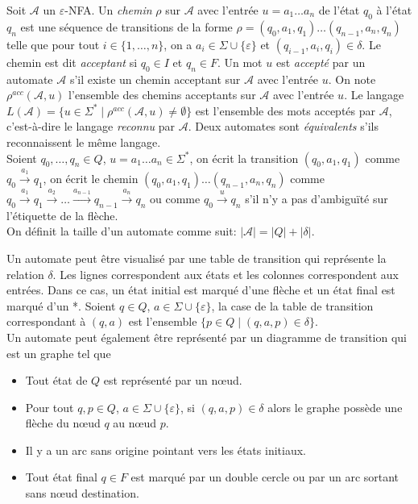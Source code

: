 	Soit $\mathscr{A}$ un $\varepsilon$-NFA. Un \emph{chemin} $\rho$ sur $\mathscr{A}$ avec l'entrée $u=a_1\ldots a_n$ de l'état $q_0$ à l'état $q_n$ est une séquence de transitions de la forme $\rho = (q_0,a_1, q_1)\ldots(q_{n-1},a_n,q_n)$ telle que pour tout $i \in \{1,\ldots ,n\}$, on a $a_i \in \Sigma \cup \{\varepsilon\}$ et $(q_{i-1},a_i,q_i) \in \delta$. Le chemin est dit \emph{acceptant} si $q_0 \in I$ et $q_n \in F$. Un mot $u$ est \emph{accepté} par un automate $\mathscr{A}$ s'il existe un chemin acceptant sur $\mathscr{A}$ avec l'entrée $u$. On note $\rho^{acc}(\mathscr{A},u)$ l'ensemble des chemins acceptants sur $\mathscr{A}$ avec l'entrée $u$. Le langage $L(\mathscr{A}) = \{u \in \Sigma^* \mid \rho^{acc}(\mathscr{A},u) \neq \emptyset\}$ est l'ensemble des mots acceptés par $\mathscr{A}$, c'est-à-dire le langage \emph{reconnu} par $\mathscr{A}$. Deux automates sont \emph{équivalents} s'ils reconnaissent le même langage. \\
	Soient $q_0,\ldots, q_n \in Q$, $u = a_1\ldots a_n \in \Sigma^*$, on écrit la transition $(q_0, a_1, q_1)$ comme $q_0 \xrightarrow{a_1} q_1$, on écrit le chemin $(q_0, a_1, q_1)\ldots(q_{n-1}, a_n, q_n)$ comme $q_0 \xrightarrow{a_1} q_1\xrightarrow{a_2}\ldots \xrightarrow{a_{n-1}}q_{n-1} \xrightarrow{a_n} q_n$ ou comme $q_0 \xrightarrow{u} q_n$ s'il n'y a pas d'ambiguïté sur l'étiquette de la flèche. \\
	On définit la taille d'un automate comme suit: $|\mathscr{A}| = |Q|+|\delta|$.
	
	Un automate peut être visualisé par une table de transition qui représente la relation $\delta$. Les lignes correspondent aux états et les colonnes correspondent aux entrées. Dans ce cas, un état initial est marqué d'une flèche et un état final est marqué d'un *. Soient $q \in Q$, $a \in \Sigma \cup \{\varepsilon\}$, la case de la table de transition correspondant à $(q,a)$ est l'ensemble $\{p \in Q \mid (q,a,p) \in \delta\}$.\\
	Un automate peut également être représenté par un diagramme de transition qui est un graphe tel que

	\begin{itemize}
		\item Tout état de $Q$ est représenté par un n\oe{}ud.
		\item Pour tout $q,p \in Q$, $a \in \Sigma \cup \{\varepsilon\}$, si $(q,a,p) \in \delta$ alors le graphe possède une flèche du n\oe{}ud $q$ au n\oe{}ud $p$.
		\item Il y a un arc sans origine pointant vers les états initiaux.
		\item Tout état final $q \in F$ est marqué par un double cercle ou par un arc sortant sans n\oe{}ud destination.
	\end{itemize}

